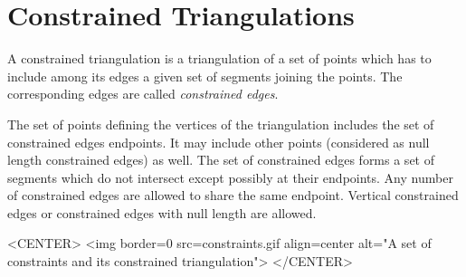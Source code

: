 \section{Constrained Triangulations}
\label{I1_Sect_Constrained}



A constrained triangulation is a triangulation of a set of points
which has to include among its edges 
a given set of segments joining the points. The corresponding 
edges are called {\em constrained edges}. 

The set of points defining the vertices of the triangulation
includes the set of constrained edges endpoints. It may include other points
(considered as null length constrained edges) as well.  The set of
constrained edges forms a set of segments which do not intersect
except possibly at their endpoints.  Any number of constrained edges
are allowed to share the same endpoint.  Vertical constrained edges or
constrained edges with null length are allowed.


\begin{ccTexOnly}
\begin{center}   \end{center}
\end{ccTexOnly}

\begin{ccHtmlOnly}
<CENTER>
<img border=0 src=constraints.gif align=center alt="A set of
constraints and its constrained triangulation">
</CENTER>
\end{ccHtmlOnly}

